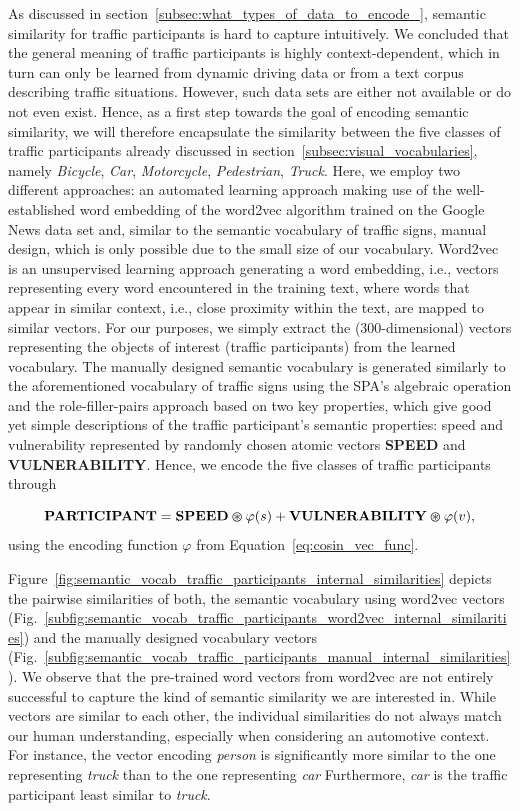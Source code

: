 As discussed in section~\ref{subsec:what_types_of_data_to_encode_}, semantic similarity for traffic participants is hard to capture intuitively.
We concluded that the general meaning of traffic participants is highly context-dependent, which in turn can only be learned from dynamic driving data or from a text corpus describing traffic situations.
However, such data sets are either not available or do not even exist.
Hence, as a first step towards the goal of encoding semantic similarity, we will therefore encapsulate the similarity between the five classes of traffic participants already discussed in section~\ref{subsec:visual_vocabularies}, namely \emph{Bicycle}, \emph{Car}, \emph{Motorcycle}, \emph{Pedestrian}, \emph{Truck}.
Here, we employ two different approaches: an automated learning approach making use of the well-established word embedding of the word2vec algorithm \parencite{Mikolov2013} trained on the Google News data set and, similar to the semantic vocabulary of traffic signs, manual design, which is only possible due to the small size of our vocabulary.
Word2vec is an unsupervised learning approach generating a word embedding, i.e., vectors representing every word encountered in the training text, where words that appear in similar context, i.e., close proximity within the text, are mapped to similar vectors. 
For our purposes, we simply extract the (\num{300}-dimensional) vectors representing the objects of interest (traffic participants) from the learned vocabulary.
The manually designed semantic vocabulary is generated similarly to the aforementioned vocabulary of traffic signs using the \ac{SPA}'s algebraic operation and the role-filler-pairs approach based on two key properties, which give good yet simple descriptions of the traffic participant's semantic properties: speed and vulnerability represented by randomly chosen atomic vectors \textbf{SPEED} and \textbf{VULNERABILITY}.
Hence, we encode the five classes of traffic participants through

\begin{equation}
\label{eq:semantic_vocab_traffic_participants}
\mathbf{PARTICIPANT} = \mathbf{SPEED} \varoast \varphi(s) + \mathbf{VULNERABILITY} \varoast \varphi(v),
\end{equation}
using the encoding function $\varphi$ from Equation~\eqref{eq:cosin_vec_func}.

Figure~\ref{fig:semantic_vocab_traffic_participants_internal_similarities} depicts the pairwise similarities of both, the semantic vocabulary using word2vec vectors (Fig.~\ref{subfig:semantic_vocab_traffic_participants_word2vec_internal_similarities}) and the manually designed vocabulary vectors (Fig.~\ref{subfig:semantic_vocab_traffic_participants_manual_internal_similarities}).
We observe that the pre-trained word vectors from word2vec are not entirely successful to capture the kind of semantic similarity we are interested in.
While vectors are similar to each other, the individual similarities do not always match our human understanding, especially when considering an automotive context.
For instance, the vector encoding \emph{person} is significantly more similar to the one representing \emph{truck} than to the one representing \emph{car} 
Furthermore, \emph{car} is the traffic participant least similar to \emph{truck}. 

